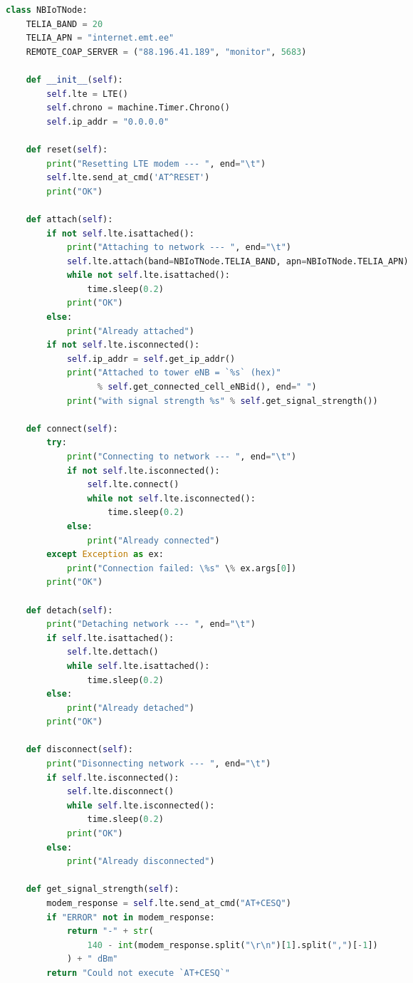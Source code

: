 \documentclass[12pt]{article}
\begin{document}
    \begin{spacing}{0.8}
        \begin{lstlisting}[language=Python]
class NBIoTNode:
    TELIA_BAND = 20
    TELIA_APN = "internet.emt.ee"
    REMOTE_COAP_SERVER = ("88.196.41.189", "monitor", 5683)

    def __init__(self):
        self.lte = LTE()
        self.chrono = machine.Timer.Chrono()
        self.ip_addr = "0.0.0.0"

    def reset(self):
        print("Resetting LTE modem --- ", end="\t")
        self.lte.send_at_cmd('AT^RESET')
        print("OK")

    def attach(self):
        if not self.lte.isattached():
            print("Attaching to network --- ", end="\t")
            self.lte.attach(band=NBIoTNode.TELIA_BAND, apn=NBIoTNode.TELIA_APN)
            while not self.lte.isattached():
                time.sleep(0.2)
            print("OK")
        else:
            print("Already attached")
        if not self.lte.isconnected():
            self.ip_addr = self.get_ip_addr()
            print("Attached to tower eNB = `%s` (hex)"
                  % self.get_connected_cell_eNBid(), end=" ")
            print("with signal strength %s" % self.get_signal_strength())

    def connect(self):
        try:
            print("Connecting to network --- ", end="\t")
            if not self.lte.isconnected():
                self.lte.connect()
                while not self.lte.isconnected():
                    time.sleep(0.2)
            else:
                print("Already connected")
        except Exception as ex:
            print("Connection failed: \%s" \% ex.args[0])
        print("OK")

    def detach(self):
        print("Detaching network --- ", end="\t")
        if self.lte.isattached():
            self.lte.dettach()
            while self.lte.isattached():
                time.sleep(0.2)
        else:
            print("Already detached")
        print("OK")

    def disconnect(self):
        print("Disonnecting network --- ", end="\t")
        if self.lte.isconnected():
            self.lte.disconnect()
            while self.lte.isconnected():
                time.sleep(0.2)
            print("OK")
        else:
            print("Already disconnected")

    def get_signal_strength(self):
        modem_response = self.lte.send_at_cmd("AT+CESQ")
        if "ERROR" not in modem_response:
            return "-" + str(
                140 - int(modem_response.split("\r\n")[1].split(",")[-1])
            ) + " dBm"
        return "Could not execute `AT+CESQ`"


\end{lstlisting}
\end{spacing}
\end{document}

